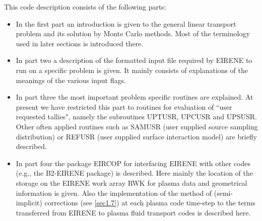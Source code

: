 This code description consists of the following parts:
\begin{itemize}
  \item In the first part an introduction is given to the general linear
        transport problem and its solution by Monte Carlo methods.
        Most of the terminology used in later sections is introduced there.
  \item In part two a description of the formatted input file required by EIRENE
        to run on a specific problem is given.
        It mainly consists of explanations of the meanings of the various input flags.
  \item In part three the most important problem specific routines are explained.
        At present we have restricted this part to routines for evaluation of ``user
        requested tallies", namely the subroutines UPTUSR, UPCUSR and UPSUSR.
        Other often applied routines such as SAMUSR (user supplied source sampling
        distribution) or REFUSR (user supplied surface interaction model) are briefly
        described.
  \item In part four the package EIRCOP for interfacing EIRENE with other codes
        (e.g., the B2-EIRENE package) is described.
        Here mainly the location of the storage on the EIRENE work array RWK for plasma
        data and geometrical information is given.
        Also the implementation of the method of (semi-implicit) corrections (see
        \cref{sec1.7}) at each plasma code time-step to the terms transferred from
        EIRENE to plasma fluid transport codes is described here.
\end{itemize}
